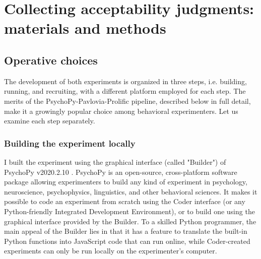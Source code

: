 \setchapterpreamble[u]{\margintoc}
\chapter{Collecting acceptability judgments: materials and methods}



\section{Operative choices} 
The development of both experiments is organized in three steps, i.e. building, running, and recruiting, with a different platform employed for each step. The merits of the PsychoPy-Pavlovia-Prolific pipeline, described below in full detail, make it a growingly popular choice among behavioral experimenters. Let us examine each step separately.

\subsection{Building the experiment locally} 
I built the experiment using the graphical interface (called "Builder") of PsychoPy v2020.2.10 \parencite{peirce2019psychopy2}. PsychoPy is an open-source, cross-platform software package allowing experimenters to build any kind of experiment in psychology, neuroscience, psychophysics, linguistics, and other behavioral sciences. It makes it possible to code an experiment from scratch using the Coder interface (or any Python-friendly Integrated Development Environment), or to build one using the graphical interface provided by the Builder. To a skilled Python programmer, the main appeal of the Builder lies in that it has a feature to translate the built-in Python functions into JavaScript code that can run online, while Coder-created experiments can only be run locally on the experimenter's computer.


